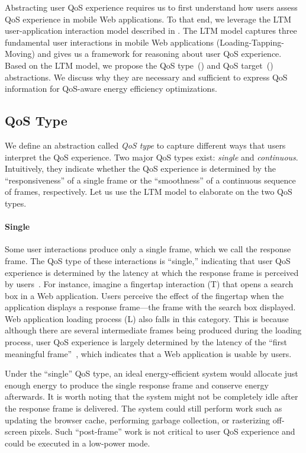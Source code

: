 Abstracting user QoS experience requires us to first understand how users assess QoS experience in mobile Web applications. To that end, we leverage the LTM user-application interaction model described in . The LTM model captures three fundamental user interactions in mobile Web applications (Loading-Tapping-Moving) and gives us a framework for reasoning about user QoS experience. Based on the LTM model, we propose the QoS type~() and QoS target~() abstractions. We discuss why they are necessary and sufficient to express QoS information for QoS-aware energy efficiency optimizations.

\subsection{QoS Type}
\label{sec:lang:abst:type}

We define an abstraction called \textit{QoS type} to capture different ways that users interpret the QoS experience. Two major QoS types exist: \textit{single} and \textit{continuous}. Intuitively, they indicate whether the QoS experience is determined by the ``responsiveness'' of a single frame or the ``smoothness'' of a continuous sequence of frames, respectively. Let us use the LTM model to elaborate on the two QoS types.



\paragraph{Single} Some user interactions produce only a single frame, which we call the response frame. The QoS type of these interactions is ``single,'' indicating that user QoS experience is determined by the latency at which the response frame is perceived by users~\cite{eventlatency}. For instance, imagine a fingertap interaction (T) that opens a search box in a Web application. Users perceive the effect of the fingertap when the application displays a response frame---the frame with the search box displayed. Web application loading process (L) also falls in this category. This is because although there are several intermediate frames being produced during the loading process, user QoS experience is largely determined by the latency of the ``first meaningful frame''~\cite{fmf}, which indicates that a Web application is usable by users.

Under the ``single'' QoS type, an ideal energy-efficient system would allocate just enough energy to produce the single response frame and conserve energy afterwards. It is worth noting that the system might not be completely idle after the response frame is delivered. The system could still perform work such as updating the browser cache, performing garbage collection, or rasterizing off-screen pixels. Such ``post-frame'' work is not critical to user QoS experience and could be executed in a low-power mode.


